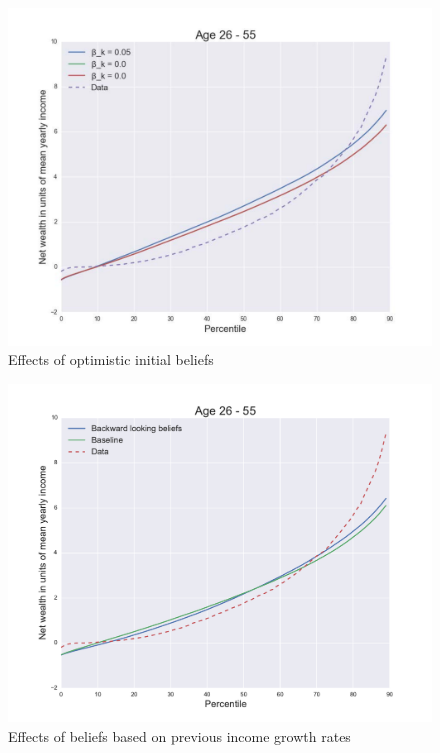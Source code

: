 \begin{figure}
\includegraphics[width=\columnwidth]{optimisticbeta}
\caption{Effects of optimistic initial beliefs}
\label{fig:optimisticbeta}
\end{figure}

\begin{figure}
\includegraphics[width=\columnwidth]{experiment}
\caption{Effects of beliefs based on previous income growth rates}
\label{fig:experiment}
\end{figure}

